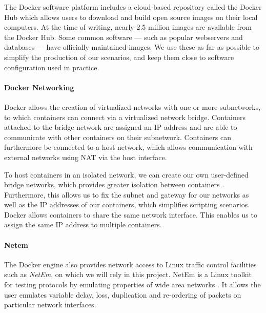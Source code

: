 \documentclass[sigconf]{acmart}
\begin{document}
The Docker software platform includes a cloud-based repository called the Docker Hub \cite{dockerhub} which allows users to download and build open source images on their local computers. At the time of writing, nearly 2.5 million images are available from the Docker Hub. Some common software --- such as popular webservers and databases --- have officially maintained images. We use these as far as possible to simplify the production of our scenarios, and keep them close to software configuration used in practice.


\paragraph*{Docker Networking} 
\label{sec:network}
Docker allows the creation of virtualized networks with one or more subnetworks, to which containers can connect via a virtualized network bridge. Containers attached to the bridge network are assigned an IP address and are able to communicate with other containers on their subnetwork. Containers can furthermore be connected to a host network, which allows communication with external networks using NAT via the host interface.

To host containers in an isolated network, we can create our own user-defined bridge networks, which provides greater isolation between containers \cite{docker_docs}. Furthermore, this allows us to fix the subnet and gateway for our networks as well as the IP addresses of our containers, which simplifies scripting scenarios. Docker allows containers to share the same network interface. This enables us to assign the same IP address to multiple containers.%

\paragraph*{Netem} 
The Docker engine also provides network access to Linux traffic control facilities such as \emph{NetEm}, on which we will rely in this project. NetEm is a Linux toolkit for testing protocols by emulating properties of wide area networks \cite{hemminger2005network}. It allows the user emulates variable delay, loss, duplication and re-ordering of packets on particular network interfaces.
\end{document}
